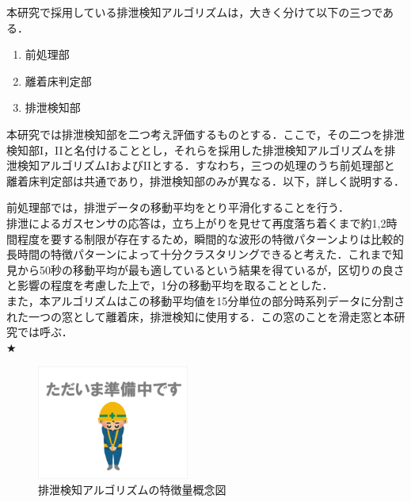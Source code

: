 本研究で採用している排泄検知アルゴリズムは，大きく分けて以下の三つである．
\begin{enumerate}
\item 前処理部
\item 離着床判定部
\item 排泄検知部
\end{enumerate}

本研究では排泄検知部を二つ考え評価するものとする．ここで，その二つを排泄検知部I，I\hspace{-.1em}Iと名付けることとし，それらを採用した排泄検知アルゴリズムを排泄検知アルゴリズムIおよびI\hspace{-.1em}Iとする．すなわち，三つの処理のうち前処理部と離着床判定部は共通であり，排泄検知部のみが異なる．以下，詳しく説明する．

前処理部では，排泄データの移動平均をとり平滑化することを行う．\\
排泄によるガスセンサの応答は，立ち上がりを見せて再度落ち着くまで約1,2時間程度を要する制限が存在するため，瞬間的な波形の特徴パターンよりは比較的長時間の特徴パターンによって十分クラスタリングできると考えた．これまで知見から50秒の移動平均が最も適しているという結果を得ているが，区切りの良さと影響の程度を考慮した上で，1分の移動平均を取ることとした．\\
また，本アルゴリズムはこの移動平均値を15分単位の部分時系列データに分割された一つの窓として離着床，排泄検知に使用する．この窓のことを滑走窓と本研究では呼ぶ．\\

★
\begin{figure}[htbp]
   \centering
   \includegraphics[width=5cm]{./fig/temp.eps}
   \caption{排泄検知アルゴリズムの特徴量概念図}
   \label{mic17a}
\end{figure}

